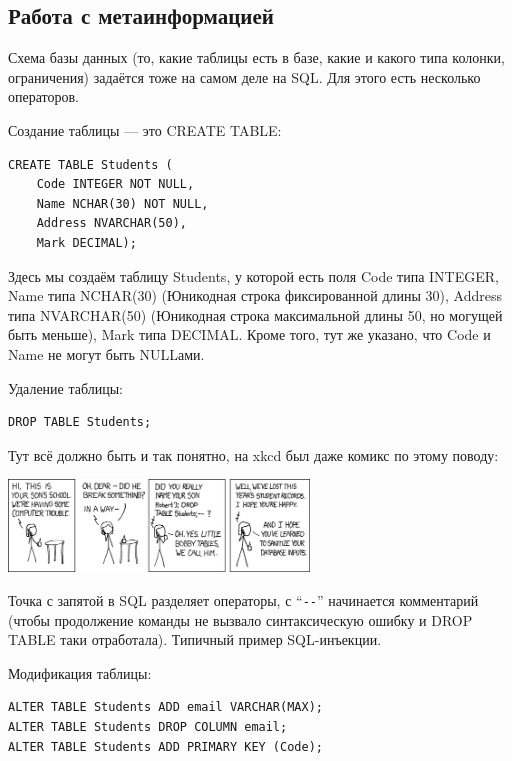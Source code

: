 \documentclass{../../text-style}
\begin{document}
\subsection{Работа с метаинформацией}

Схема базы данных (то, какие таблицы есть в базе, какие и какого типа колонки, ограничения) задаётся тоже на самом деле на SQL. Для этого есть несколько операторов.

Создание таблицы --- это CREATE TABLE:

\begin{verbatim}
CREATE TABLE Students (
    Code INTEGER NOT NULL,
    Name NCHAR(30) NOT NULL,
    Address NVARCHAR(50),
    Mark DECIMAL);
\end{verbatim}

Здесь мы создаём таблицу Students, у которой есть поля Code типа INTEGER, Name типа NCHAR(30) (Юникодная строка фиксированной длины 30), Address типа NVARCHAR(50) (Юникодная строка максимальной длины 50, но могущей быть меньше), Mark типа DECIMAL. Кроме того, тут же указано, что Code и Name не могут быть NULLами.

Удаление таблицы:

\begin{verbatim}
DROP TABLE Students;
\end{verbatim}

Тут всё должно быть и так понятно, на xkcd был даже комикс по этому поводу:

\begin{center}
    \includegraphics[width=0.6\textwidth]{bobbyTables.png}
\end{center}

Точка с запятой в SQL разделяет операторы, с ``\verb|--|'' начинается комментарий (чтобы продолжение команды не вызвало синтаксическую ошибку и DROP TABLE таки отработала). Типичный пример SQL-инъекции.

Модификация таблицы:

\begin{verbatim}
ALTER TABLE Students ADD email VARCHAR(MAX);
ALTER TABLE Students DROP COLUMN email;
ALTER TABLE Students ADD PRIMARY KEY (Code);
\end{verbatim}
\end{document}
